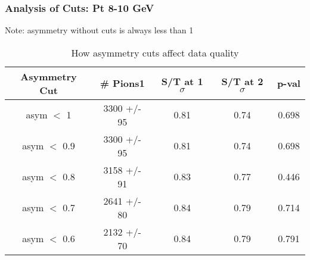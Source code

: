 \frame
{
\frametitle{Analysis of Cuts: Pt  8-10 GeV}
Note: asymmetry without cuts is always less than 1
\begin{table}
\caption{How asymmetry cuts affect data quality}
\centering
\begin{tabular}{c c c c c}
\hline\hline
Asymmetry Cut & \# Pions1 & S/T at 1 $\sigma$ & S/T at 2 $\sigma$ & p-val \\ [0.5ex]
\hline
asym $<$ 1 & 3300 +/-   95 & 0.81 & 0.74 & 0.698 \\ %
asym $<$ 0.9 & 3300 +/-   95 & 0.81 & 0.74 & 0.698 \\ %
asym $<$ 0.8 & 3158 +/-   91 & 0.83 & 0.77 & 0.446 \\ %
asym $<$ 0.7 & 2641 +/-   80 & 0.84 & 0.79 & 0.714 \\ %
asym $<$ 0.6 & 2132 +/-   70 & 0.84 & 0.79 & 0.791 \\ %
[1ex]
\hline
\end{tabular}
\label{table:nonlin}
\end{table}
}
